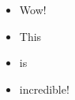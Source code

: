 \usepackage{enumitem}

\begin{itemize}[label=$.$]
    \item Wow!
    \item This
    \item is
    \item incredible!
\end{itemize}

